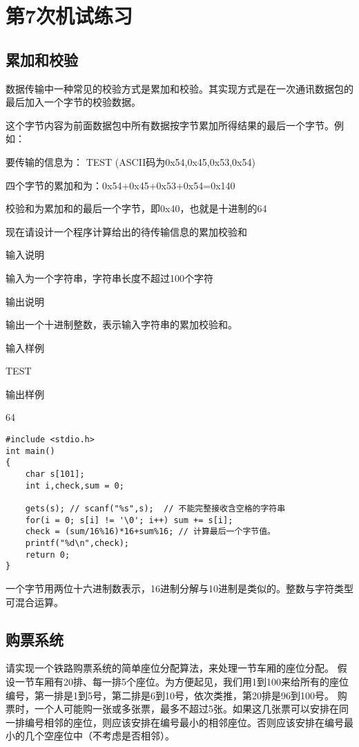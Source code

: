 %
%
%
\chapter{第7次机试练习}

\section{累加和校验}
数据传输中一种常见的校验方式是累加和校验。其实现方式是在一次通讯数据包的最后加入一个字节的校验数据。

这个字节内容为前面数据包中所有数据按字节累加所得结果的最后一个字节。例如： 

要传输的信息为： TEST (ASCII码为0x54,0x45,0x53,0x54)

四个字节的累加和为：0x54+0x45+0x53+0x54=0x140 

校验和为累加和的最后一个字节，即0x40，也就是十进制的64 

现在请设计一个程序计算给出的待传输信息的累加校验和 

输入说明

输入为一个字符串，字符串长度不超过100个字符

输出说明

输出一个十进制整数，表示输入字符串的累加校验和。

输入样例

TEST

输出样例

64

\begin{lstlisting}
#include <stdio.h>
int main()
{
	char s[101];
	int i,check,sum = 0; 
	
	gets(s); // scanf("%s",s);  // 不能完整接收含空格的字符串 
	for(i = 0; s[i] != '\0'; i++) sum += s[i];
	check = (sum/16%16)*16+sum%16; // 计算最后一个字节值。
	printf("%d\n",check);
	return 0;
}
\end{lstlisting}

\begin{note}[要点]
	一个字节用两位十六进制数表示，16进制分解与10进制是类似的。整数与字符类型可混合运算。
\end{note}

\section{购票系统}
请实现一个铁路购票系统的简单座位分配算法，来处理一节车厢的座位分配。 
假设一节车厢有20排、每一排5个座位。为方便起见，我们用1到100来给所有的座位编号，第一排是1到5号，第二排是6到10号，依次类推，第20排是96到100号。 
购票时，一个人可能购一张或多张票，最多不超过5张。如果这几张票可以安排在同一排编号相邻的座位，则应该安排在编号最小的相邻座位。否则应该安排在编号最小的几个空座位中（不考虑是否相邻）。 

